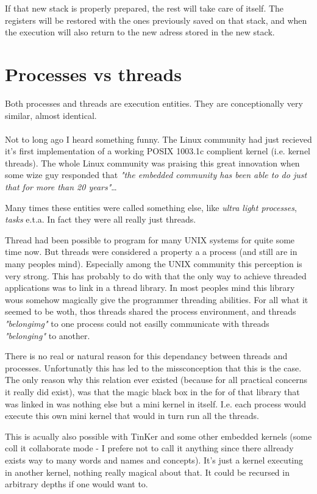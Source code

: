 			If that new stack is properly prepared, the rest will take care of itself. The registers will be restored with the ones previously saved on that stack, and when the execution will also return to the new adress stored in the new stack.
			

	\section{Processes vs threads}
		Both processes and threads are execution entities. They are conceptionally very similar, almost identical.\\
		\\
		Not to long ago I heard something funny. The Linux community had just recieved it's first implementation of a working POSIX 1003.1c complient kernel (i.e. kernel threads). The whole Linux community was praising this great innovation when some wize guy responded that \textit{"the embedded community has been able to do just that for more than 20 years"}\ldots

		Many times these entities were called something else, like \textit{ultra light processes}, \textit{tasks} e.t.a. In fact they were all really just threads.

		Thread had been possible to program for many UNIX systems for quite some time now. But threads were considered a property a a process (and still are in many peoples mind). Especially among the UNIX community this perception is very strong. This has probably to do with that the only way to achieve threaded applications was to link in a thread library. In most peoples mind this library wous somehow magically give the programmer threading abilities. For all what it seemed to be woth, thos threads shared the process environment, and threads \textit{"belongimg"} to one process could not easilly communicate with threads \textit{"belonging"} to another.

		There is no real or natural reason for this dependancy between threads and processes. Unfortunatly this has led to the missconception that this is the case. The only reason why this relation ever existed (because for all practical concerns it really did exist), was that the magic black box in the for of that library that was linked in was nothing else but a mini kernel in itself. I.e. each process would execute this own mini kernel that would in turn run all the threads.

		This is acually also possible with TinKer and some other embedded kernels (some coll it collaborate mode - I prefere not to call it anything since there allready exists way to many words and names and concepts). It's just a kernel executing in another kernel, nothing really magical about that. It could be recursed in arbitrary depths if one would want to.

